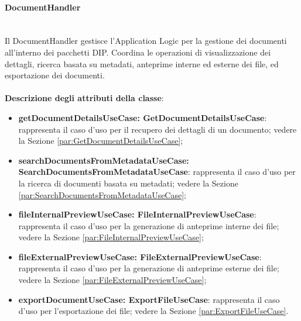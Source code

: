 \documentclass[a4paper,12pt]{article}
\begin{document}
{{{                \paragraph{DocumentHandler}\label{par:DocumentHandler}\mbox{}\\
                Il DocumentHandler gestisce l'Application Logic per la gestione dei documenti all'interno dei pacchetti DIP. Coordina le operazioni di visualizzazione dei dettagli, ricerca basata su metadati, anteprime interne ed esterne dei file, ed esportazione dei documenti.\\
                \\
                \textbf{Descrizione degli attributi della classe}:
                \begin{itemize}
                    \item \textbf{getDocumentDetailsUseCase: GetDocumentDetailsUseCase}: rappresenta il caso d'uso per il recupero dei dettagli di un documento; vedere la Sezione \ref{par:GetDocumentDetailsUseCase};
                    \item \textbf{searchDocumentsFromMetadataUseCase:\\ SearchDocumentsFromMetadataUseCase}: rappresenta il caso d'uso per la ricerca di documenti basata su metadati; vedere la Sezione \ref{par:SearchDocumentsFromMetadataUseCase};
                    \item \textbf{fileInternalPreviewUseCase: FileInternalPreviewUseCase}: rappresenta il caso d'uso per la generazione di anteprime interne dei file; vedere la Sezione \ref{par:FileInternalPreviewUseCase};
                    \item \textbf{fileExternalPreviewUseCase: FileExternalPreviewUseCase}: rappresenta il caso d'uso per la generazione di anteprime esterne dei file; vedere la Sezione \ref{par:FileExternalPreviewUseCase};
                    \item \textbf{exportDocumentUseCase: ExportFileUseCase}: rappresenta il caso d'uso per l'esportazione dei file; vedere la Sezione \ref{par:ExportFileUseCase}.
                \end{itemize}
            
}}}
\end{document}

